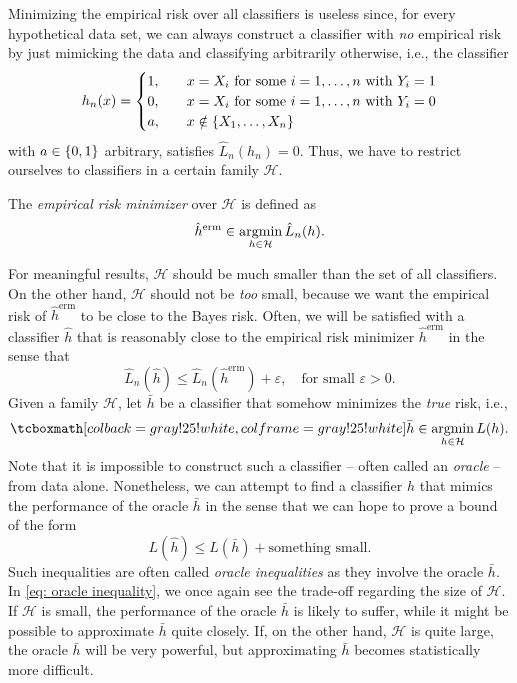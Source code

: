 Minimizing the empirical risk over all classifiers is useless since, for every hypothetical data set, we can always construct a classifier with \emph{no} empirical risk by just mimicking the data and classifying arbitrarily otherwise, i.e., the classifier
\[
    h_n(x) = \begin{cases}
        1, \quad &x = X_i \text{ for some } i = 1, \dots, n \text{ with } Y_i = 1 \\
        0, \quad &x = X_i \text{ for some } i = 1, \dots, n \text{ with } Y_i = 0 \\
        a, \quad &x \notin \left\{X_1, \dots, X_n\right\}
    \end{cases}
\]
with $a \in \left\{0, 1\right\}$ arbitrary, satisfies $\hat L_n(h_n) = 0$. Thus, we have to restrict ourselves to classifiers in a certain family $\mathcal{H}$.

\begin{definition}
The \emph{empirical risk minimizer} over $\mathcal{H}$ is defined as
\[
    \hat{h}^{\text{erm}} \in \operatorname*{argmin}_{h \in \mathcal{H}} \hat L_n(h).
\]
\end{definition}

For meaningful results, $\mathcal{H}$ should be much smaller than the set of all classifiers. On the other hand, $\mathcal{H}$ should not be \emph{too} small, because we want the empirical risk of $\hat{h}^{\text{erm}}$ to be close to the Bayes risk. Often, we will be satisfied with a classifier $\hat h$ that is reasonably close to the empirical risk minimizer $\hat{h}^{\text{erm}}$ in the sense that
\[
    \hat L_n(\hat h) \leq \hat L_n(\hat{h}^{\text{erm}}) + \varepsilon, \quad \text{for small } \varepsilon > 0.
\]
Given a family $\mathcal{H}$, let $\bar h$ be a classifier that somehow minimizes the \emph{true} risk, i.e.,
\[
    \highlightMath{
        \bar h \in \argmin_{h\in \mathcal{H}} L(h).
    }
\]
Note that it is impossible to construct such a classifier -- often called an \emph{oracle} -- from data alone. Nonetheless, we can attempt to find a classifier $\hat h$ that mimics the performance of the oracle $\bar h$ in the sense that we can hope to prove a bound of the form
\begin{equation}
    \label{eq: oracle inequality}
    L(\hat h) \leq L(\bar h) + \text{something small}.
\end{equation}
Such inequalities are often called \emph{oracle inequalities} as they involve the oracle $\bar h$. In \eqref{eq: oracle inequality}, we once again see the trade-off regarding the size of $\mathcal{H}$. If $\mathcal{H}$ is small, the performance of the oracle $\bar h$ is likely to suffer, while it might be possible to approximate $\bar h$ quite closely. If, on the other hand, $\mathcal{H}$ is quite large, the oracle $\bar h$ will be very powerful, but approximating $\bar h$ becomes statistically more difficult.

